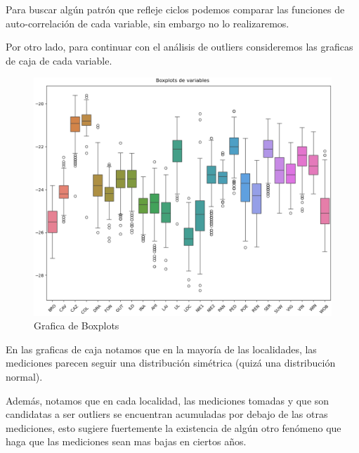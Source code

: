 \documentclass[a4paper,11pt]{article}
\begin{document}
\newpage


Para buscar algún patrón que refleje ciclos podemos comparar las funciones de
auto-correlación de cada variable, sin embargo no lo realizaremos.


Por otro lado, para continuar con el análisis de outliers consideremos las
graficas de caja de cada variable.

\begin{figure}[ht]
	\centering
	\includegraphics[width=0.7\linewidth]{figures/boxplots.png}
	\caption{Grafica de Boxplots}
	\label{}
\end{figure}

\newpage

En las graficas de caja notamos que en la mayoría de las localidades, las
mediciones parecen seguir una distribución simétrica (quizá una distribución
normal).

Además, notamos que en cada localidad, las mediciones tomadas y que son
candidatas a ser outliers se encuentran acumuladas por debajo de las otras
mediciones, esto sugiere fuertemente la existencia de algún otro fenómeno que
haga que las mediciones sean mas bajas en ciertos años.
\end{document}
